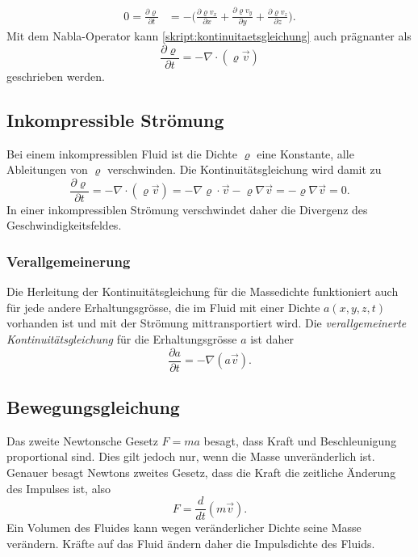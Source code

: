 \begin{align}
0
=
\frac{\partial \varrho}{\partial t}
&=
-
\biggl(
\frac{\partial \varrho v_x}{\partial x}
+
\frac{\partial \varrho v_y}{\partial y}
+
\frac{\partial \varrho v_z}{\partial z}
\biggr).
\label{skript:kontinuitaetsgleichung}
\end{align}
%
Mit dem Nabla-Operator kann
\eqref{skript:kontinuitaetsgleichung}
auch prägnanter als
\begin{equation}
\frac{\partial \varrho}{\partial t}
=
-\nabla\cdot (\varrho\vec{v})
\label{skript:hydro:kontvekt}
\end{equation}
geschrieben werden.

\subsection{Inkompressible Strömung}
Bei einem inkompressiblen Fluid ist die Dichte $\varrho$ eine Konstante, alle
Ableitungen von $\varrho$ verschwinden.
Die Kontinuitätsgleichung wird damit zu
\[
\frac{\partial\varrho}{\partial t}
=
-\nabla\cdot(\varrho\vec{v})
=
-\nabla\varrho\cdot\vec{v}
-\varrho\nabla\vec{v}
=
-\varrho\nabla\vec{v}
=
0.
\]
In einer inkompressiblen Strömung verschwindet daher die Divergenz
des Geschwindigkeitsfeldes.

\subsubsection{Verallgemeinerung}
Die Herleitung der Kontinuitätsgleichung für die Massedichte funktioniert
auch für jede andere Erhaltungsgrösse, die im Fluid mit einer Dichte
$a(x,y,z,t)$ vorhanden ist und mit der Strömung mittransportiert wird.
Die {\em verallgemeinerte Kontinuitätsgleichung} für die Erhaltungsgrösse $a$
ist daher
\begin{equation}
\frac{\partial a}{\partial t}
=
-
\nabla(a\vec{v}).
\label{skript:verallgemeinerte kontinuitaetsgleichung}
\end{equation}

\subsection{Bewegungsgleichung}
Das zweite Newtonsche Gesetz $F=ma$ besagt, dass Kraft und Beschleunigung
proportional sind.
Dies gilt jedoch nur, wenn die Masse unveränderlich ist.
Genauer besagt Newtons zweites Gesetz, dass die Kraft die
zeitliche Änderung des Impulses ist, also
\[
F=
\frac{d}{dt}(m\vec v).
\]
Ein Volumen des Fluides kann wegen veränderlicher Dichte seine
Masse verändern.
Kräfte auf das Fluid ändern daher die Impulsdichte des Fluids.

